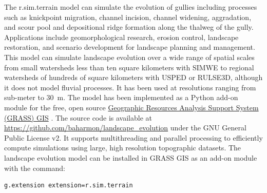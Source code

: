 \documentclass[gmd, manuscript]{copernicus}
\begin{document}
The r.sim.terrain model
can simulate the evolution of gullies
including processes such as 
knickpoint migration,
channel incision, 
channel widening, 
aggradation, and
scour pool and 
depositional ridge formation
along the thalweg of the gully. 
Applications include 
geomorphological research,
erosion control, 
landscape restoration, 
and scenario development 
for landscape planning and management.
This model can simulate landscape evolution 
over a wide range of spatial scales 
from small watersheds 
less than ten square kilometers
with SIMWE
to regional watersheds
of hundreds of square kilometers
with USPED or RULSE3D,
although it does not model fluvial processes. 
It has been used at resolutions ranging from sub-meter to 30~\unit{m}.
The model has been implemented 
as a Python add-on module 
for the free, open source
\href{https://grass.osgeo.org/}{Geographic Resources Analysis Support System (GRASS) GIS}
\citep{GRASS}. 
The source code is available at 
\url{https://github.com/baharmon/landscape\_evolution} 
under the GNU General Public License v2.
It supports multithreading and parallel processing
to efficiently compute simulations 
using large, high resolution topographic datasets.
%
The landscape evolution model 
can be installed in GRASS GIS as an add-on module 
with the command: 
\begin{verbatim}
g.extension extension=r.sim.terrain
\end{verbatim}

\end{document}
